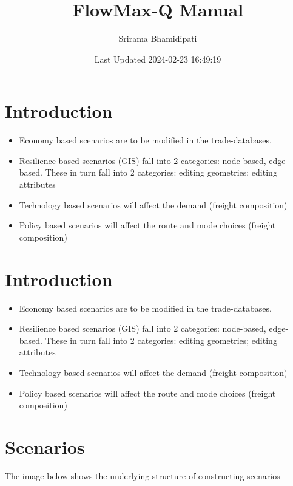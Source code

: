 \documentclass[
]{book}
\title{FlowMax-Q Manual}
\author{Srirama Bhamidipati}
\date{Last Updated 2024-02-23 16:49:19}
\providecommand{\tightlist}{%
  \setlength{\itemsep}{0pt}\setlength{\parskip}{0pt}}
\begin{document}
\maketitle

{
\setcounter{tocdepth}{1}
\tableofcontents
}
\hypertarget{introduction}{%
\chapter{Introduction}\label{introduction}}

\begin{itemize}
\tightlist
\item
  Economy based scenarios are to be modified in the trade-databases.
\item
  Resilience based scenarios (GIS) fall into 2 categories: node-based, edge-based. These in turn fall into 2 categories: editing geometries; editing attributes
\item
  Technology based scenarios will affect the demand (freight composition)
\item
  Policy based scenarios will affect the route and mode choices (freight composition)
\end{itemize}

\hypertarget{introduction-1}{%
\chapter{Introduction}\label{introduction-1}}

\begin{itemize}
\tightlist
\item
  Economy based scenarios are to be modified in the trade-databases.
\item
  Resilience based scenarios (GIS) fall into 2 categories: node-based, edge-based. These in turn fall into 2 categories: editing geometries; editing attributes
\item
  Technology based scenarios will affect the demand (freight composition)
\item
  Policy based scenarios will affect the route and mode choices (freight composition)
\end{itemize}

\hypertarget{scenarios}{%
\chapter{Scenarios}\label{scenarios}}

The image below shows the underlying structure of constructing scenarios
\end{document}
